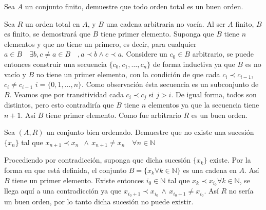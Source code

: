\begin{problem}
    Sea $A$ un conjunto finito, demuestre que todo orden total es un buen
    orden.
\end{problem}
\begin{sol}
    Sea $R$ un orden total en $A$, y $B$ una cadena arbitraria no vacía. Al
    ser $A$ finito, $B$ es finito, se demostrará que $B$ tiene primer
    elemento. Suponga que $B$ tiene $n$ elementos y que no tiene un primero, es decir, para cualquier $a \in B \quad
    \exists b, c \neq a \in B \quad , a \prec b \land c \prec a$. Considere
    un $c_0 \in B$ arbitrario, se puede entonces construir una secuencia
    $\{c_0, c_1, \ldots, c_n \}$ de forma inductiva ya que $B$ es no vacío y
    $B$ no tiene un primer elemento, con la condición de que cada $c_i \prec
    c_{i-1}$, $c_i \neq c_{i-1}$ $i=\{0,1,\ldots,n\}$. Como observación ésta
    secuencia es un subconjunto de $B$. Veamos que por transitividad cada
    $c_i \prec c_j$ si $j>i$. De igual forma, todos son distintos, pero esto
    contradiría que $B$ tiene $n$ elementos ya que la secuencia tiene $n+1$.
    Así $B$ tiene primer elemento. Como fue arbitrario $R$ es un buen orden.
\end{sol}
\begin{problem}
    Sea $(A,R)$ un conjunto bien ordenado. Demuestre que no existe una
    sucesión $\{x_n\}$ tal que $x_{n+1} \prec x_n$ $\, \land \, x_{n+1} \neq
    x_n \quad \forall n \in
    \mathbb{N}$
    \label{pr:pr11}
\end{problem}
\begin{sol}
    Procediendo por contradicción, suponga que dicha sucesión $\{x_k\}$
    existe. Por la forma en que está definida, el conjunto $B =\{x_k \forall
    k \in \mathbb{N}\}$ es una cadena en $A$. Así $B$ tiene un primer
    elemento. Existe entonces $i_0 \in \mathbb{N}$ tal que $x_k \prec
    x_{i_0} \forall k \in \mathbb{N}$, se llega aquí a una contradicción
    ya que $x_{i_0+1} \prec x_{i_0} \, \land \, x_{i_0 +1} \neq x_{i_0}$. 
    Así $R$ no sería un buen orden, por lo tanto dicha sucesión no puede
    existir.
\end{sol}
